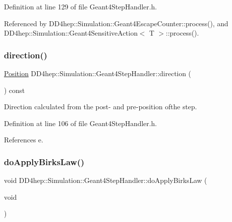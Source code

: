 Definition at line 129 of file Geant4\+Step\+Handler.\+h.



Referenced by D\+D4hep\+::\+Simulation\+::\+Geant4\+Escape\+Counter\+::process(), and D\+D4hep\+::\+Simulation\+::\+Geant4\+Sensitive\+Action$<$ T $>$\+::process().

\hypertarget{class_d_d4hep_1_1_simulation_1_1_geant4_step_handler_a14b596b04db07b10254b26148e28fcb9}{}\label{class_d_d4hep_1_1_simulation_1_1_geant4_step_handler_a14b596b04db07b10254b26148e28fcb9} 
\subsubsection{\texorpdfstring{direction()}{direction()}}
{\footnotesize\ttfamily \hyperlink{namespace_d_d4hep_1_1_geometry_a55083902099d03506c6db01b80404900}{Position} D\+D4hep\+::\+Simulation\+::\+Geant4\+Step\+Handler\+::direction (\begin{DoxyParamCaption}{ }\end{DoxyParamCaption}) const\hspace{0.3cm}{\ttfamily [inline]}}



Direction calculated from the post-\/ and pre-\/position ofthe step. 



Definition at line 106 of file Geant4\+Step\+Handler.\+h.



References e.

\hypertarget{class_d_d4hep_1_1_simulation_1_1_geant4_step_handler_a67ef04d7d190e233ae9f3a23d5aedf33}{}\label{class_d_d4hep_1_1_simulation_1_1_geant4_step_handler_a67ef04d7d190e233ae9f3a23d5aedf33} 
\subsubsection{\texorpdfstring{do\+Apply\+Birks\+Law()}{doApplyBirksLaw()}}
{\footnotesize\ttfamily void D\+D4hep\+::\+Simulation\+::\+Geant4\+Step\+Handler\+::do\+Apply\+Birks\+Law (\begin{DoxyParamCaption}\item[{void}]{ }\end{DoxyParamCaption})\hspace{0.3cm}{\ttfamily [inline]}}



